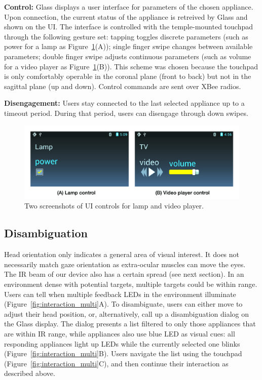 {\bf Control:} Glass displays a user interface for parameters of the chosen appliance. Upon connection, the current status of the appliance is retreived by Glass and shown on the UI. The interface is controlled with the temple-mounted touchpad through the following gesture set: tapping toggles discrete parameters (such as power for a lamp as Figure~\ref{fig:ui_controls}(A)); single finger swipe changes between available parameters; double finger swipe adjusts continuous parameters (such as volume for a video player as Figure~\ref{fig:ui_controls}(B)). This scheme was chosen because the touchpad is only comfortably operable in the coronal plane (front to back) but not in the sagittal plane (up and down). 
Control commands are sent over XBee radios.

{\bf Disengagement:} Users stay connected to the last selected appliance up to a timeout period. During that period, users can disengage through down swipes.

\begin{figure}[t!]
\centering
\includegraphics[width=\columnwidth]{figures/ui_controls_caption.jpg}
\caption{Two screenshots of UI controls for lamp and video player.}
\label{fig:ui_controls}
\end{figure}

\subsection{Disambiguation}
Head orientation only indicates a general area of visual interest. It does not necessarily match gaze orientation as extra-ocular muscles can move the eyes. The IR beam of our device also has a certain spread (see next section). In an environment dense with potential targets, multiple targets could be within range. Users can tell when multiple feedback LEDs in the environment illuminate (Figure~\ref{fig:interaction_multi}A). To disambiguate, users can either move to adjust their head position, or, alternatively, call up a disambiguation dialog on the Glass display. The dialog presents a list filtered to only those appliances that are within IR range, while appliances also use blue LED as visual cues: all responding appliances light up LEDs while the currently selected one blinks (Figure~\ref{fig:interaction_multi}B). Users navigate the list using the touchpad (Figure~\ref{fig:interaction_multi}C), and then continue their interaction as described above.
